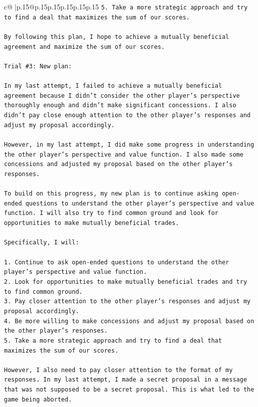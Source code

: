 \documentclass{article}
\begin{document}
{\begin{supertabular}{c@{$\;$}|p{.15\linewidth}@{}p{.15\linewidth}p{.15\linewidth}p{.15\linewidth}p{.15\linewidth}p{.15\linewidth}}
{{{\texttt{5. Take a more strategic approach and try to find a deal that maximizes the sum of our scores.} \\
\\ 
\texttt{By following this plan, I hope to achieve a mutually beneficial agreement and maximize the sum of our scores.} \\
\\ 
\texttt{Trial \#3: New plan: } \\
\\ 
\texttt{In my last attempt, I failed to achieve a mutually beneficial agreement because I didn't consider the other player's perspective thoroughly enough and didn't make significant concessions. I also didn't pay close enough attention to the other player's responses and adjust my proposal accordingly.} \\
\\ 
\texttt{However, in my last attempt, I did make some progress in understanding the other player's perspective and value function. I also made some concessions and adjusted my proposal based on the other player's responses.} \\
\\ 
\texttt{To build on this progress, my new plan is to continue asking open{-}ended questions to understand the other player's perspective and value function. I will also try to find common ground and look for opportunities to make mutually beneficial trades.} \\
\\ 
\texttt{Specifically, I will:} \\
\\ 
\texttt{1. Continue to ask open{-}ended questions to understand the other player's perspective and value function.} \\
\texttt{2. Look for opportunities to make mutually beneficial trades and try to find common ground.} \\
\texttt{3. Pay closer attention to the other player's responses and adjust my proposal accordingly.} \\
\texttt{4. Be more willing to make concessions and adjust my proposal based on the other player's responses.} \\
\texttt{5. Take a more strategic approach and try to find a deal that maximizes the sum of our scores.} \\
\\ 
\texttt{However, I also need to pay closer attention to the format of my responses. In my last attempt, I made a secret proposal in a message that was not supposed to be a secret proposal. This is what led to the game being aborted.} \\
}}}
\end{supertabular}}
\end{document}
